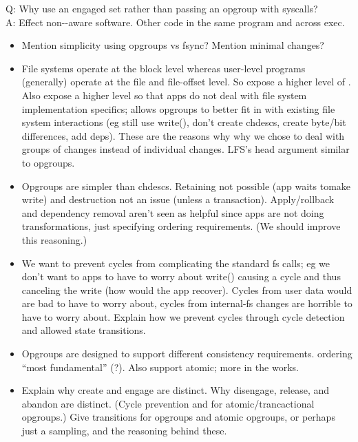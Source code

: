 Q: Why use an engaged set rather than passing an opgroup with syscalls?\\
A: Effect non-\opgroup{}-aware software. Other code in the same program
and across exec.

\begin{itemize}
\item Mention simplicity using opgroups vs fsync? Mention minimal changes?
\item File systems operate at the block level whereas user-level
  programs (generally) operate at the file and file-offset level.
  So expose a higher level of \chdescs. Also expose a
  higher level so that apps do not deal with file system
  implementation specifics; allows opgroups to better fit in with
  existing file system interactions (eg still use write(), don't
  create chdescs, create byte/bit differences, add deps). These are
  the reasons why why we chose to deal with groups of changes
  instead of individual changes. LFS's head argument similar to
  opgroups.
\item Opgroups are simpler than chdescs. Retaining not possible (app
  waits tomake write) and destruction not an issue (unless a
  transaction). Apply/rollback and dependency removal aren't seen as
  helpful since apps are not doing transformations, just specifying
  ordering requirements. (We should improve this reasoning.)
\item We want to prevent cycles from complicating the standard fs
  calls; eg we don't want to apps to have to worry about write()
  causing a cycle and thus canceling the write (how would the app
  recover). Cycles from user data would are bad to have to worry
  about, cycles from internal-fs changes are horrible to have to
  worry about. Explain how we prevent cycles through cycle detection
  and allowed state transitions.

\item Opgroups are designed to support different consistency
  requirements. ordering ``most fundamental'' (?). Also support
  atomic; more in the works.
\item Explain why create and engage are distinct. Why disengage,
  release, and abandon are distinct. (Cycle prevention and for
  atomic/trancactional opgroups.) Give transitions for opgroups and
  atomic opgroups, or perhaps just a sampling, and the reasoning
  behind these.
\end{itemize}

